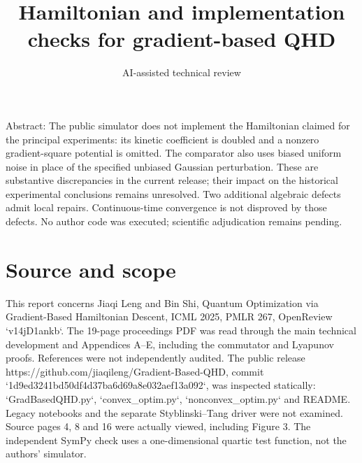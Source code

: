 \documentclass[10pt]{article}
\title{Hamiltonian and implementation checks for gradient-based QHD}
\author{AI-assisted technical review}
\date{}
\begin{document}
\maketitle
Abstract: The public simulator does not implement the Hamiltonian claimed for the principal experiments: its kinetic coefficient is doubled and a nonzero gradient-square potential is omitted. The comparator also uses biased uniform noise in place of the specified unbiased Gaussian perturbation. These are substantive discrepancies in the current release; their impact on the historical experimental conclusions remains unresolved. Two additional algebraic defects admit local repairs. Continuous-time convergence is not disproved by those defects. No author code was executed; scientific adjudication remains pending.\par
\section*{Source and scope}
This report concerns Jiaqi Leng and Bin Shi, Quantum Optimization via Gradient-Based Hamiltonian Descent, ICML 2025, PMLR 267, OpenReview `v14jD1ankb`. The 19-page proceedings PDF was read through the main technical development and Appendices A–E, including the commutator and Lyapunov proofs. References were not independently audited. The public release https://github.com/jiaqileng/Gradient-Based-QHD, commit `1d9ed3241bd50df4d37ba6d69a8e032aef13a092`, was inspected statically: `GradBasedQHD.py`, `convex\_optim.py`, `nonconvex\_optim.py` and README. Legacy notebooks and the separate Styblinski–Tang driver were not examined. Source pages 4, 8 and 16 were actually viewed, including Figure 3. The independent SymPy check uses a one-dimensional quartic test function, not the authors’ simulator.\par
\end{document}
